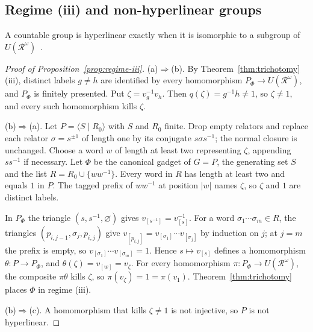 \subsection{Regime (iii) and non-hyperlinear groups}\label{app:regime-iii}

A countable group is hyperlinear exactly when it is isomorphic to a subgroup of
$U(\mathcal R^\omega)$~\cite[Remark~8.4 and Theorem~8.5]{Pestov2008}.

\begin{proof}[Proof of Proposition~\ref{prop:regime-iii}]
(a)$\Rightarrow$(b). By Theorem~\ref{thm:trichotomy}(iii), distinct labels $g\ne h$ are identified by
every homomorphism $P_\Phi\to U(\mathcal R^\omega)$, and $P_\Phi$ is finitely presented. Put
$\zeta=v_g^{-1}v_h$. Then $q(\zeta)=g^{-1}h\ne1$, so $\zeta\ne1$, and every such homomorphism kills $\zeta$.

(b)$\Rightarrow$(a). Let $P=\langle S\mid R_0\rangle$ with $S$ and $R_0$ finite. Drop empty relators and
replace each relator $\sigma=s^{\pm1}$ of length one by its conjugate $s\sigma s^{-1}$; the normal
closure is unchanged. Choose a word $w$ of length at least two representing $\zeta$, appending $ss^{-1}$
if necessary. Let $\Phi$ be the canonical gadget of $G=P$, the generating set $S$ and the list
$R=R_0\cup\{ww^{-1}\}$. Every word in $R$ has length at least two and equals $1$ in $P$. The tagged
prefix of $ww^{-1}$ at position $|w|$ names $\zeta$, so $\zeta$ and $1$ are distinct labels.

In $P_\Phi$ the triangle $(s,s^{-1},\varnothing)$ gives $v_{[s^{-1}]}=v_{[s]}^{-1}$. For a word
$\sigma_1\cdots\sigma_m\in R$, the triangles $(p_{i,j-1},\sigma_j,p_{i,j})$ give
$v_{[p_{i,j}]}=v_{[\sigma_1]}\cdots v_{[\sigma_j]}$ by induction on $j$; at $j=m$ the prefix is empty, so
$v_{[\sigma_1]}\cdots v_{[\sigma_m]}=1$. Hence $s\mapsto v_{[s]}$ defines a homomorphism
$\theta:P\to P_\Phi$, and $\theta(\zeta)=v_{[w]}=v_\zeta$. For every homomorphism
$\pi:P_\Phi\to U(\mathcal R^\omega)$, the composite $\pi\theta$ kills $\zeta$, so $\pi(v_\zeta)=1=\pi(v_1)$.
Theorem~\ref{thm:trichotomy} places $\Phi$ in regime (iii).

(b)$\Rightarrow$(c). A homomorphism that kills $\zeta\ne1$ is not injective, so $P$ is not hyperlinear.


\end{proof}

